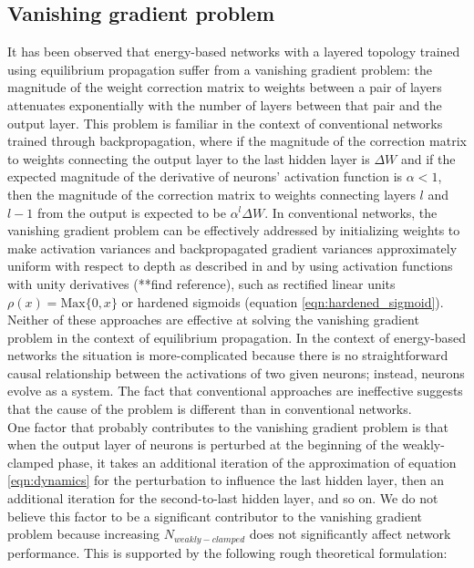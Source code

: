 \documentclass{article}
\newcommand{\npar}{\\\indent}
\begin{document}
\subsection{Vanishing gradient problem}
\label{sec:vangrad}

It has been observed \cite{scellier17} that energy-based networks with a layered topology trained using equilibrium propagation suffer from a vanishing gradient problem: the magnitude of the weight correction matrix to weights between a pair of layers attenuates exponentially with the number of layers between that pair and the output layer. This problem is familiar in the context of conventional networks trained through backpropagation, where if the magnitude of the correction matrix to weights connecting the output layer to the last hidden layer is $\Delta W$ and if the expected magnitude of the derivative of neurons' activation function is $\alpha<1$, then the magnitude of the correction matrix to weights connecting layers $l$ and $l-1$ from the output is expected to be $\alpha^l\Delta W$. In conventional networks, the vanishing gradient problem can be effectively addressed by initializing weights to make activation variances and backpropagated gradient variances approximately uniform with respect to depth as described in \cite{glorot2010} and by using activation functions with unity derivatives (**find reference), such as rectified linear units $\rho(x)=\text{Max}\{0, x\}$ or hardened sigmoids (equation \ref{eqn:hardened_sigmoid}).
\npar
Neither of these approaches are effective at solving the vanishing gradient problem in the context of equilibrium propagation. In the context of energy-based networks the situation is more-complicated because there is no straightforward causal relationship between the activations of two given neurons; instead, neurons evolve as a system. The fact that conventional approaches are ineffective suggests that the cause of the problem is different than in conventional networks.
\npar
One factor that probably contributes to the vanishing gradient problem is that when the output layer of neurons is perturbed at the beginning of the weakly-clamped phase, it takes an additional iteration of the approximation of equation \ref{eqn:dynamics} for the perturbation to influence the last hidden layer, then an additional iteration for the second-to-last hidden layer, and so on. We do not believe this factor to be a significant contributor to the vanishing gradient problem because increasing $N_{weakly-clamped}$ does not significantly affect network performance. This is supported by the following rough theoretical formulation:
\end{document}
